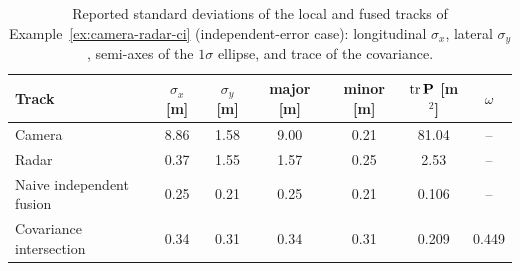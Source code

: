 \begin{example}
\begin{table}[!t]
    \centering
    \small
    \caption{Reported standard deviations of the local and fused tracks of Example~\ref{ex:camera-radar-ci} (independent-error case): longitudinal $\sigma_{x}$, lateral $\sigma_{y}$, semi-axes of the $1\sigma$ ellipse, and trace of the covariance.}
    \label{tab:camera-radar-ci}
    \begin{tabular}{lcccccc}
        \hline
        \textbf{Track} & $\sigma_{x}$ [m] & $\sigma_{y}$ [m] & major [m] & minor [m] & $\operatorname{tr}\mathbf{P}$ [m$^{2}$] & $\omega$ \\
        \hline
        Camera & 8.86 & 1.58 & 9.00 & 0.21 & 81.04 & -- \\
        Radar & 0.37 & 1.55 & 1.57 & 0.25 & 2.53 & -- \\
        Naive independent fusion & 0.25 & 0.21 & 0.25 & 0.21 & 0.106 & -- \\
        Covariance intersection & 0.34 & 0.31 & 0.34 & 0.31 & 0.209 & 0.449 \\
        \hline
    \end{tabular}
\end{table}


\end{example}
